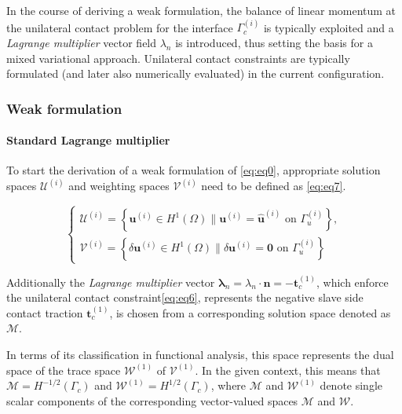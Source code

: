 \documentclass[a4paper,10pt]{article} %
\begin{document}
In the course of deriving a weak formulation, the balance of linear momentum at the unilateral contact problem  for the interface $\Gamma_c^{(i)}$ is typically exploited and a \textit{Lagrange multiplier} vector field $\lambda_n$ is introduced, thus setting the basis for a mixed variational approach. Unilateral contact constraints are typically
formulated (and later also numerically evaluated) in the current configuration.

\subsubsection{Weak formulation}

\paragraph{Standard Lagrange multiplier}

To start the derivation of a weak formulation of \eqref{eq:eq0}, appropriate solution spaces $\mathcal{U}^{(i)}$ and
weighting spaces $\mathcal{V}^{(i)}$ need to be defined as \eqref{eq:eq7}.

\begin{equation}\label{eq:eq7}
 \begin{cases}
  \mathcal{U}^{(i)} = \left\{ \mathbf{u}^{(i)} \in H^1(\Omega) \| \mathbf{u}^{(i)} = \hat{\mathbf{u}}^{(i)} \text{ on } \Gamma_u^{(i)}\right\},\\
  \mathcal{V}^{(i)} = \left\{ \delta\mathbf{u}^{(i)} \in H^1(\Omega) \| \delta\mathbf{u}^{(i)} = \mathbf{0} \text{ on } \Gamma_u^{(i)}\right\}
 \end{cases}
\end{equation}

Additionally the \textit{Lagrange multiplier} vector $\boldsymbol{\lambda}_n = \lambda_n \cdot \mathbf{n} = -\mathbf{t}_c^{(1)}$, which enforce the unilateral contact constraint\eqref{eq:eq6}, represents the negative slave side contact traction $\mathbf{t}_c^{(1)}$, is chosen from a corresponding solution space denoted as $\mathcal{M}$.

In terms of its classification in functional analysis, this space represents the dual space of the trace space $\mathcal{W}^{(1)}$ of $\mathcal{V}^{(1)}$. In the given context, this means that $\mathcal{M} = H^{−1/2} (\Gamma_c)$ and $\mathcal{W}^{(1)} = H^{1/2} (\Gamma_c)$, where $\mathcal{M}$  and $\mathcal{W}^{(1)}$ denote single scalar components of the corresponding vector-valued spaces $\mathcal{M}$ and $\mathcal{W}$.
\end{document}
